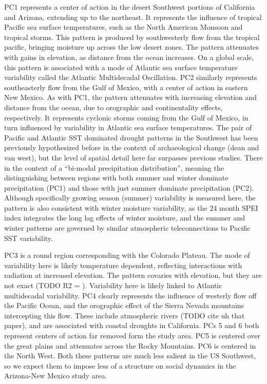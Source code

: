 \documentclass[fleqn,10pt]{wlscirep}
\begin{document}
PC1 represents a center of action in the desert Southwest portions of California and Arizona, extending up to the northeast. It represents the influence of tropical Pacific sea surface temperatures, such as the North American Monsoon and tropical storms. This pattern is produced by southwesterly flow from the tropical pacific, bringing moisture up across the low desert zones. The pattern attenuates with gains in elevation, as distance from the ocean increases. On a global scale, this pattern is associated with a mode of Atlantic sea surface temperature variability called the Atlantic Multidecadal Oscillation. PC2 similarly represents southeasterly flow from the Gulf of Mexico, with a center of action in eastern New Mexico. As with PC1, the pattern attenuates with increasing elevation and distance from the ocean, due to orographic and continentality effects, respectively. It represents cyclonic storms coming from the Gulf of Mexico, in turn influenced by variability in Atlantic sea surface temperatures. The pair of Pacific and Atlantic SST dominated drought patterns in the Southwest has been previously hypothesized before in the context of archaeological change (dean and van west), but the level of spatial detail here far surpasses previous studies. There in the context of a ``bi-modal precipitation distribution'', meaning the distinguishing between regions with both summer and winter dominate precipitation (PC1) and those with just summer dominate precipitation (PC2). Although specifically growing season (summer) variability is measured here, the pattern is also consistent with winter moisture variability, as the 24 month SPEI index integrates the long lag effects of winter moisture, and the summer and winter patterns are governed by similar atmospheric teleconnections to Pacific SST variability. 

PC3 is a round region corresponding with the Colorado Plateau. The mode of variability here is likely temperature dependent, reflecting interactions with radiation at increased elevation. The pattern covaries with elevation, but they are not exact (TODO R2 = ). Variability here is likely linked to Atlantic multidecadal variability. PC4 clearly represents the influence of westerly flow off the Pacific Ocean, and the orographic effect of the Sierra Nevada mountains intercepting this flow. These include atmospheric rivers (TODO cite uh that paper), and are associated with coastal droughts in California. PCs 5 and 6 both represent centers of action far removed form the study area. PC5 is centered over the great plains and attenuates across the Rocky Mountains. PC6 is centered in the North West. Both these patterns are much less salient in the US Southwest, so we expect them to impose less of a structure on social dynamics in the Arizona-New Mexico study area.
\end{document}
